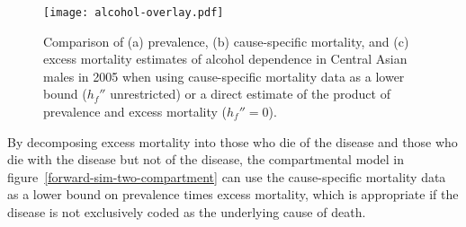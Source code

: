    \begin{figure}[h]
        \begin{center}
            \texttt{[image: alcohol-overlay.pdf]}
            \caption{Comparison of (a) prevalence,
              (b) cause-specific mortality, and (c) excess
              mortality estimates of alcohol
              dependence in Central Asian males in 2005 when using
              cause-specific mortality data as a lower bound ($h_f''$ unrestricted)
              or a direct estimate of the product of
              prevalence and excess mortality ($h_f'' = 0$).}
            \label{fig:app-alcohol compare}
        \end{center}
    \end{figure}

By decomposing excess mortality into those who die of the
disease and those who die with the disease but not of the disease, the
compartmental model in figure~\ref{forward-sim-two-compartment} can
use the cause-specific mortality data as a lower bound on prevalence
times excess mortality, which is appropriate if the
disease is not exclusively coded as the underlying cause of death.

